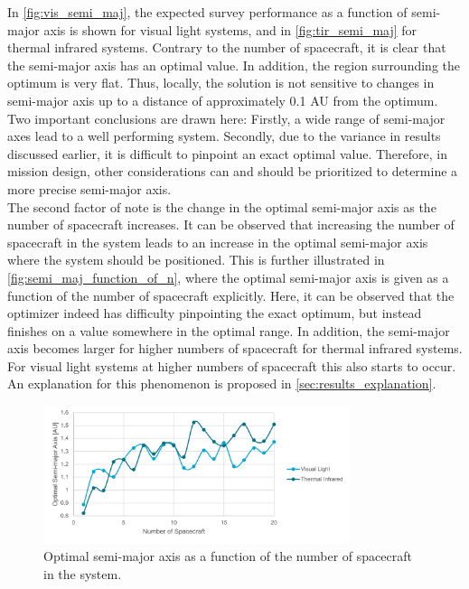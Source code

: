 In \autoref{fig:vis_semi_maj}, the expected survey performance as a function of semi-major axis is shown for visual light systems, and in \autoref{fig:tir_semi_maj} for thermal infrared systems. Contrary to the number of spacecraft, it is clear that the semi-major axis has an optimal value. In addition, the region surrounding the optimum is very flat. Thus, locally, the solution is not sensitive to changes in semi-major axis up to a distance of approximately 0.1 AU from the optimum. Two important conclusions are drawn here: Firstly, a wide range of semi-major axes lead to a well performing system. Secondly, due to the variance in results discussed earlier, it is difficult to pinpoint an exact optimal value. Therefore, in mission design, other considerations can and should be prioritized to determine a more precise semi-major axis. \\

The second factor of note is the change in the optimal semi-major axis as the number of spacecraft increases. It can be observed that increasing the number of spacecraft in the system leads to an increase in the optimal semi-major axis where the system should be positioned. This is further illustrated in \autoref{fig:semi_maj_function_of_n}, where the optimal semi-major axis is given as a function of the number of spacecraft explicitly. Here, it can be observed that the optimizer indeed has difficulty pinpointing the exact optimum, but instead finishes on a value somewhere in the optimal range. In addition, the semi-major axis becomes larger for higher numbers of spacecraft for thermal infrared systems. For visual light systems at higher numbers of spacecraft this also starts to occur. An explanation for this phenomenon is proposed in \autoref{sec:results_explanation}.

\begin{figure}[htbp]
 \centering
 \includegraphics[width=0.8\textwidth]{img/semi_maj_function_of_n.pdf}
 \caption{Optimal semi-major axis as a function of the number of spacecraft in the system.}
 \label{fig:semi_maj_function_of_n}
\end{figure}



